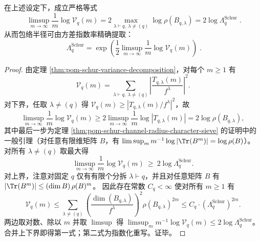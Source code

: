 \begin{theorem}[方差增长率的谱等式]\label{thm:pom-schur-variance-growth-rate-spectral-identity}
在上述设定下，成立严格等式
\[
\boxed{\;
\limsup_{m\to\infty}\frac{1}{m}\log \mathcal V_q(m)
=
2\max_{\lambda\vdash q,\ \lambda\neq(q)}\log\rho(B_{q,\lambda})
=
2\log\Lambda_q^{\mathrm{Schur}}\; }.
\]
从而包络半径可由方差指数率精确提取：
\[
\boxed{\;
\Lambda_q^{\mathrm{Schur}}
=\exp\!\left(\frac12\limsup_{m\to\infty}\frac{1}{m}\log \mathcal V_q(m)\right)\; } .
\]
\end{theorem}
\begin{proof}
由定理 \ref{thm:pom-schur-variance-decomposition}，对每个 \(m\ge 1\) 有
\[
\mathcal V_q(m)=\sum_{\lambda\vdash q,\ \lambda\neq(q)}\left|\frac{T_{q,\lambda}(m)}{f^\lambda}\right|^2.
\]
对下界，任取 \(\lambda\neq(q)\) 得 \(\mathcal V_q(m)\ge |T_{q,\lambda}(m)/f^\lambda|^2\)，故
\[
\limsup_{m\to\infty}\frac{1}{m}\log \mathcal V_q(m)
\ge
2\limsup_{m\to\infty}\frac{1}{m}\log|T_{q,\lambda}(m)|
=2\log\rho(B_{q,\lambda}),
\]
其中最后一步为定理 \ref{thm:pom-schur-channel-radius-character-sieve} 的证明中的一般引理（对任意有限维矩阵 \(B\)，有 \(\limsup_m m^{-1}\log|\Tr(B^m)|=\log\rho(B)\)）。
对所有 \(\lambda\neq(q)\) 取最大得
\[
\limsup_{m\to\infty}\frac{1}{m}\log \mathcal V_q(m)\ \ge\ 2\log\Lambda_q^{\mathrm{Schur}}.
\]
对上界，注意对固定 \(q\) 仅有有限个分拆 \(\lambda\vdash q\)，并且对任意矩阵 \(B\) 有
\(|\Tr(B^m)|\le (\dim B)\,\rho(B)^m\)。
因此存在常数 \(C_q<\infty\) 使对所有 \(m\ge 1\) 有
\[
\mathcal V_q(m)
\le
\sum_{\lambda\neq(q)}\left(\frac{\dim(B_{q,\lambda})}{f^\lambda}\right)^2\rho(B_{q,\lambda})^{2m}
\le
C_q\cdot(\Lambda_q^{\mathrm{Schur}})^{2m}.
\]
两边取对数、除以 \(m\) 并取 \(\limsup\) 得
\(
\limsup_m m^{-1}\log\mathcal V_q(m)\le 2\log\Lambda_q^{\mathrm{Schur}}
\)。
合并上下界即得第一式；第二式为指数化重写。证毕。
\end{proof}

